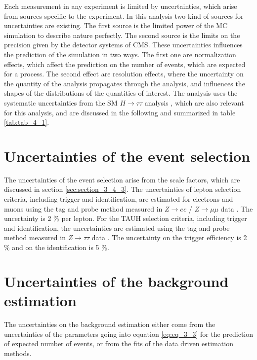 \label{sec:section_4}

Each measurement in any experiment is limited by uncertainties, which arise from sources specific to the experiment. In this analysis two kind of sources for uncertainties are existing. The first source is the limited power of the \gls{MC} simulation to describe nature perfectly. The second source is the limits on the precision given by the detector systems of \gls{CMS}. These uncertainties influences the prediction of the simulation in two ways. The first one are normalization effects, which affect the prediction on the number of events, which are expected for a process. The second effect are resolution effects, where the uncertainty on the quantity of the analysis propagates through the analysis, and influences the shapes of the distributions of the quantities of interest. The analysis uses the systematic uncertainties from the SM $H\to\tau\tau$ analysis \cite{SMHTT}, which are also relevant for this analysis, and are discussed in the following and summarized in table \ref{tab:tab_4_1}.

\section{Uncertainties of the event selection}

The uncertainties of the event selection arise from the scale factors, which are discussed in section \ref{sec:section_3_4_3}. The uncertainties of lepton selection criteria, including trigger and identification, are estimated for electrons and muons using the tag and probe method measured in $Z \to ee$ / $Z\to \mu\mu$ data \cite{ERECO, MUONRECO}. The uncertainty is 2 \% per lepton. For the \gls{TAUH} selection criteria, including trigger and identification, the uncertainties are estimated using the tag and probe method measured in $Z \to \tau\tau$ data \cite{TAURECO}. The uncertainty on the trigger efficiency is 2 \% and on the identification is 5 \%.

\section{Uncertainties of the background estimation}

The uncertainties on the background estimation either come from the uncertainties of the parameters going into equation \ref{eq:eq_3_3} for the prediction of expected number of events, or from the fits of the data driven estimation methods.  

